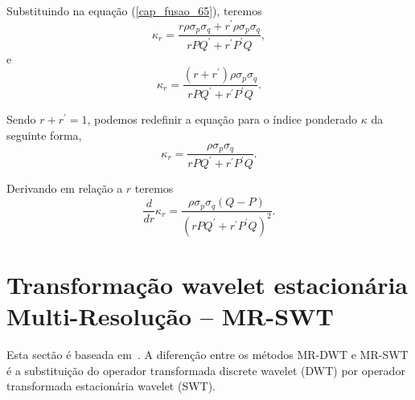 Substituindo na equação (\ref{cap_fusao_65}), teremos
\begin{equation}\nonumber
	\kappa_r = \frac{r\rho \sigma_p\sigma_q + r^{'}\rho \sigma_p\sigma_q}{rPQ^{'} +r^{'}P^{'}Q},
\end{equation}
e
\begin{equation}\nonumber
	\kappa_r = \frac{(r+ r^{'})\rho \sigma_p\sigma_q}{rPQ^{'} +r^{'}P^{'}Q}.
\end{equation}

Sendo $r+r^{'}=1$, podemos redefinir a equação para o índice ponderado $\kappa$ da seguinte forma,
\begin{equation}\label{cap_fusao_26}
	\kappa_r = \frac{\rho \sigma_p\sigma_q}{rPQ^{'} +r^{'}P^{'}Q}.
\end{equation}

Derivando em relação a $r$ teremos
\begin{equation}\label{cap_fusao_26}
	\frac{d}{dr} \kappa_r= \frac{\rho \sigma_p\sigma_q(Q-P)}{(rPQ^{'} +r^{'}P^{'}Q)^2}.
\end{equation}


\section{Transformação wavelet estacionária Multi-Resolução -- MR-SWT} 
Esta sectão é baseada em~\cite{n_r, jjly}. A diferenção entre os métodos MR-DWT e MR-SWT é a substituição do operador transformada discrete wavelet (DWT) por operador transformada estacionária wavelet (SWT).


